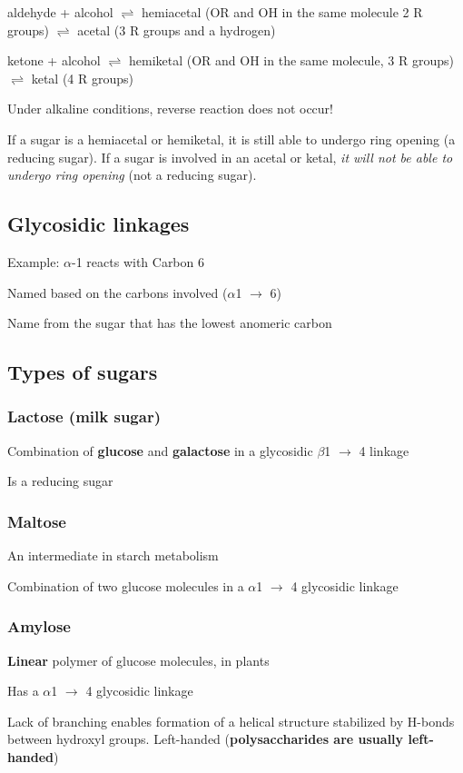 \documentclass[letterpaper, 12pt]{article}
\begin{document}
aldehyde + alcohol $\rightleftharpoons$ hemiacetal (OR and OH in the same molecule 2 R groups) $\rightleftharpoons$ acetal (3 R groups and a hydrogen)

ketone + alcohol $\rightleftharpoons$ hemiketal (OR and OH in the same molecule, 3 R groups) $\rightleftharpoons$ ketal (4 R groups)

Under alkaline conditions, reverse reaction does not occur!

If a sugar is a hemiacetal or hemiketal, it is still able to undergo ring opening (a reducing sugar). If a sugar is involved in an acetal or ketal, \textit{it will not be able to undergo ring opening} (not a reducing sugar).

\subsection*{Glycosidic linkages}
Example: $\alpha$-1 reacts with Carbon 6

Named based on the carbons involved ($\alpha$1 $\to$ 6)

Name from the sugar that has the lowest anomeric carbon

\subsection*{Types of sugars}

\subsubsection*{Lactose (milk sugar)}
Combination of \textbf{glucose} and \textbf{galactose} in a glycosidic $\beta$1 $\to$ 4 linkage

Is a reducing sugar

\subsubsection*{Maltose}
An intermediate in starch metabolism

Combination of two glucose molecules in a $\alpha$1 $\to$ 4 glycosidic linkage

\subsubsection*{Amylose}
\textbf{Linear} polymer of glucose molecules, in plants

Has a $\alpha$1 $\to$ 4 glycosidic linkage

Lack of branching enables formation of a helical structure stabilized by H-bonds between hydroxyl groups. Left-handed (\textbf{polysaccharides are usually left-handed})
\end{document}
